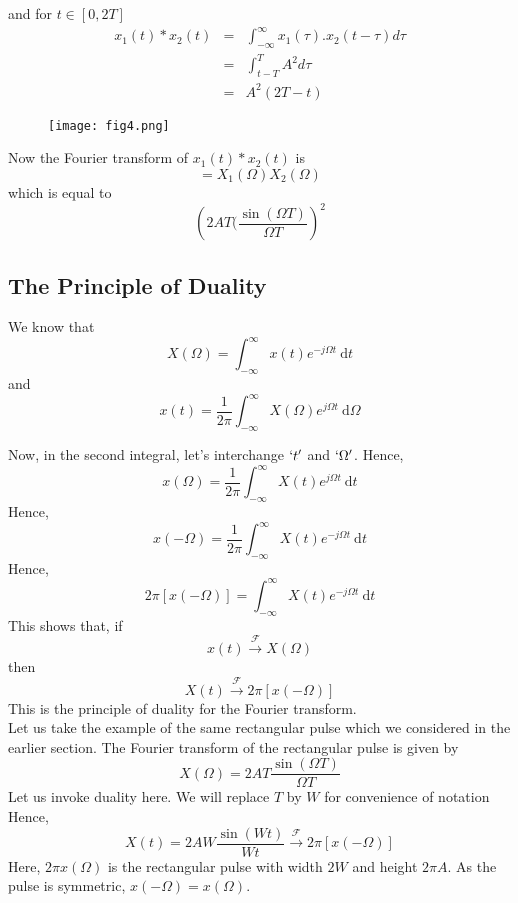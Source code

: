 and for $t \in [0,2T]$
\begin{eqnarray}
x_1(t)*x_2(t) &=& \int_{-\infty}^{\infty}x_1(\tau).x_2(t-\tau)d\tau\\
&=&\int_{t-T}^{T}A^2 d\tau \\
&=& A^2 (2T-t)
\end{eqnarray}
\begin{figure}[ht]
\centering
\texttt{[image: fig4.png]}
\end{figure}
\newpage
Now the Fourier transform of $x_1(t)*x_2(t)$ is
\[
= X_1(\Omega)X_2(\Omega)
\]
which is equal to
\[
\left( 2AT(\frac{\sin(\Omega T)}{\Omega T} \right) ^2
\] 

\subsection{The Principle of Duality}

We know that
\[
X(\Omega) = \int_{-\infty}^{\infty} \! x(t) e^{-j\Omega t} \ \mathrm{d}t
\]
and
\[
x(t) = \frac{1}{2\pi}\int_{-\infty}^{\infty} \! X(\Omega) e^{j\Omega t} \ \mathrm{d}\Omega
\]

Now, in the second integral, let's interchange $`t'$ and $`\Omega'$. Hence,
\[
x(\Omega) = \frac{1}{2\pi}\int_{-\infty}^{\infty} \! X(t) e^{j\Omega t} \ \mathrm{d}t
\]
Hence,
\[
x(-\Omega) = \frac{1}{2\pi}\int_{-\infty}^{\infty} \! X(t) e^{-j\Omega t} \ \mathrm{d}t
\]
Hence,
\[
2\pi [x(-\Omega)] = \int_{-\infty}^{\infty} \! X(t) e^{-j\Omega t} \ \mathrm{d}t
\]
This shows that, if
\[
x(t) \xrightarrow{\mathcal{F}} X(\Omega)
\]
then
\begin{equation}
X(t) \xrightarrow{\mathcal{F}} 2\pi [x(-\Omega)]
\end{equation}
This is the principle of duality for the Fourier transform. \\
\noindent
Let us take the example of the same rectangular pulse which we considered in the earlier section. The Fourier transform of the rectangular pulse is given by
\[
X(\Omega) = 2AT \frac{\sin(\Omega T)}{\Omega T}
\]
Let us invoke duality here. We will replace $T$ by $W$ for convenience of notation Hence,
\[
X(t) = 2AW \frac{\sin{(W t)}}{W t} \xrightarrow{\mathcal{F}} 2\pi [x(-\Omega)]
\]
Here, $2\pi x(\Omega)$ is the rectangular pulse with width $2W$ and height $2\pi A$. As the pulse is symmetric, $x(-\Omega) = x(\Omega)$.\\

